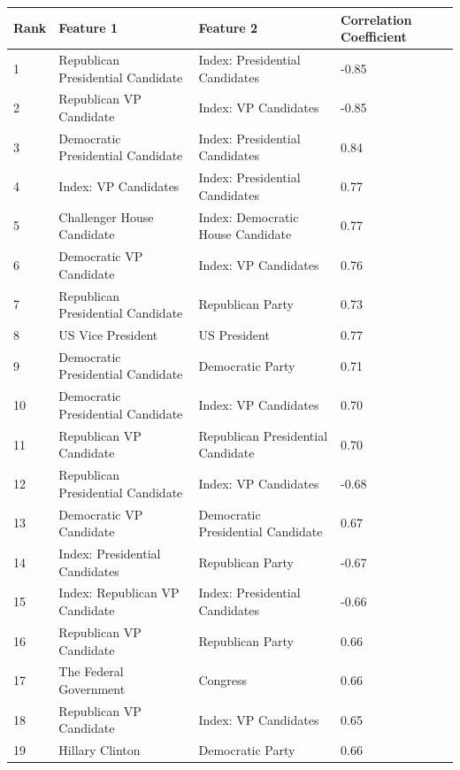 \documentclass{article}
\begin{document}
	\begin{table}[h!]
		\begin{center}
			\begin{tabular}{ |m{1cm}|m{6cm}|m{6cm}|m{2cm}| } 
				\hline
				Rank & Feature 1 & Feature 2 & Correlation Coefficient \\
				\hline
				1 & Republican Presidential Candidate & Index: Presidential Candidates & -0.85 \\
				\hline
				2 & Republican VP Candidate & Index: VP Candidates & -0.85 \\
				\hline
				3 & Democratic Presidential Candidate & Index: Presidential Candidates & 0.84 \\
				\hline
				4 & Index: VP Candidates & Index: Presidential Candidates & 0.77 \\
				\hline
				5 & Challenger House Candidate & Index: Democratic House Candidate & 0.77 \\
				\hline
				6 & Democratic VP Candidate & Index: VP Candidates & 0.76 \\
				\hline
				7 & Republican Presidential Candidate & Republican Party & 0.73 \\
				\hline
				8 & US Vice President & US President & 0.77 \\
				\hline
				9 & Democratic Presidential Candidate & Democratic Party & 0.71 \\
				\hline
				10 & Democratic Presidential Candidate & Index: VP Candidates & 0.70 \\
				\hline
				11 & Republican VP Candidate & Republican Presidential Candidate & 0.70 \\
				\hline
				12 & Republican Presidential Candidate & Index: VP Candidates & -0.68 \\
				\hline
				13 & Democratic VP Candidate & Democratic Presidential Candidate & 0.67 \\
				\hline
				14 & Index: Presidential Candidates & Republican Party & -0.67 \\
				\hline
				15 & Index: Republican VP Candidate & Index: Presidential Candidates & -0.66 \\
				\hline
				16 & Republican VP Candidate & Republican Party & 0.66 \\
				\hline
				17 & The Federal Government & Congress & 0.66 \\
				\hline
				18 & Republican VP Candidate & Index: VP Candidates & 0.65 \\
				\hline
				19 & Hillary Clinton & Democratic Party & 0.66 \\

\end{tabular}
\end{center}
\end{table}
\end{document}

